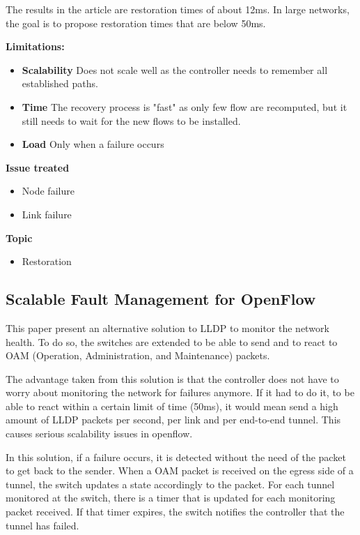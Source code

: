 \documentclass[compsoc]{IEEEtran}
\begin{document}
The results in the article are restoration times of about 12ms. In large networks, the goal is to propose restoration times that are below 50ms.

\textbf{Limitations:}
\begin{itemize}
	\item \textbf{Scalability} Does not scale well as the controller needs to remember all established paths.
	\item \textbf{Time} The recovery process is "fast" as only few flow are recomputed, but it still needs to wait for the new flows to be installed.
	\item \textbf{Load} Only when a failure occurs
\end{itemize}

\textbf{Issue treated}
\begin{itemize}
	\item Node failure
	\item Link failure
\end{itemize}

\textbf{Topic}
\begin{itemize}
	\item Restoration
\end{itemize}

\subsection{Scalable Fault Management for OpenFlow \cite{6364688}}
This paper present an alternative solution to LLDP to monitor the network health. To do so, the switches are extended to be able to send and to react to OAM (Operation, Administration, and Maintenance) packets.

The advantage taken from this solution is that the controller does not have to worry about monitoring the network for failures anymore. If it had to do it, to be able to react within a certain limit of time (50ms), it would mean send a high amount of LLDP packets per second, per link and per end-to-end tunnel. This causes serious scalability issues in openflow.

In this solution, if a failure occurs, it is detected without the need of the packet to get back to the sender. When a OAM packet is received on the egress side of a tunnel, the switch updates a state accordingly to the packet. For each tunnel monitored at the switch, there is a timer that is updated for each monitoring packet received. If that timer expires, the switch notifies the controller that the tunnel has failed.
\end{document}
